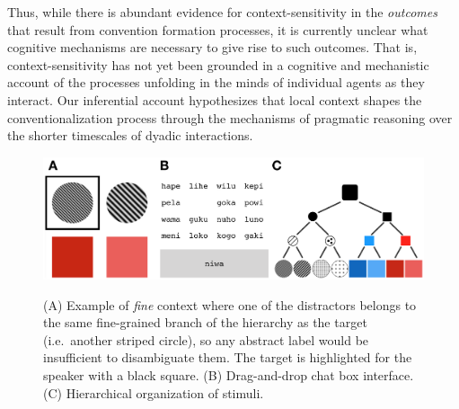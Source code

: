 Thus, while there is abundant evidence for context-sensitivity in the \emph{outcomes} that result from convention formation processes, it is currently unclear what cognitive mechanisms are necessary to give rise to such outcomes.
That is, context-sensitivity has not yet been grounded in a cognitive and mechanistic account of the processes unfolding in the minds of individual agents as they interact.
Our inferential account hypothesizes that local context shapes the conventionalization process through the mechanisms of pragmatic reasoning over the shorter timescales of dyadic interactions.


\begin{figure}[t]
\begin{center}
{\includegraphics[scale=.55]{./figures/Sec2-design.png}}
{\caption{{(A) Example of \emph{fine} context where one of the distractors belongs to the same fine-grained branch of the hierarchy as the target (i.e.\ another striped circle), so any abstract label would be insufficient to disambiguate them. The target is highlighted for the speaker with a black square. (B) Drag-and-drop chat box interface. (C) Hierarchical organization of stimuli.\label{fig:context_design}}}}
\vspace{-2ex}
\end{center}
\end{figure}


